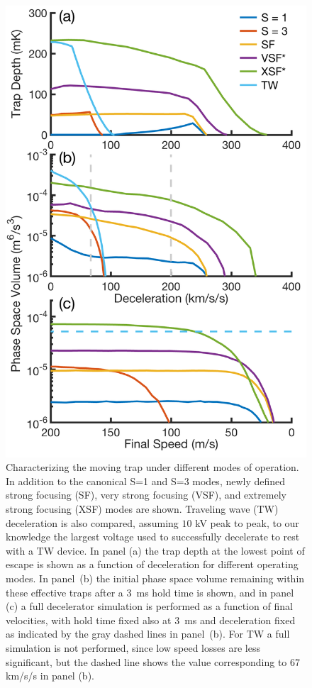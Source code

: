 \documentclass[%
 reprint,
 amsmath,amssymb,
 aps,
prl,
]{revtex4-1}
\begin{document}
\begin{figure}[t]
\includegraphics[width=\linewidth]{full-three-panel.png}%
\vspace{-5pt}
\caption{
Characterizing the moving trap under different modes of operation. In addition to the canonical S=1 and S=3 modes, newly defined strong focusing (SF), very strong focusing (VSF), and extremely strong focusing (XSF) modes are shown. Traveling wave (TW) deceleration is also compared, assuming $10$ kV peak to peak, to our knowledge the largest voltage used to successfully decelerate to rest with a TW device. In panel (a) the trap depth at the lowest point of escape is shown as a function of deceleration for different operating modes. In panel~(b) the initial phase space volume remaining within these effective traps after a $3$~ms hold time is shown, and in panel (c) a full decelerator simulation is performed as a function of final velocities, with hold time fixed also at $3$~ms and deceleration fixed as indicated by the gray dashed lines in panel~(b). For TW a full simulation is not performed, since low speed losses are less significant, but the dashed line shows the value corresponding to 67 km/s/s in panel (b).\vspace{-4mm}}
\label{fig:efftrap}
\end{figure}
\end{document}

